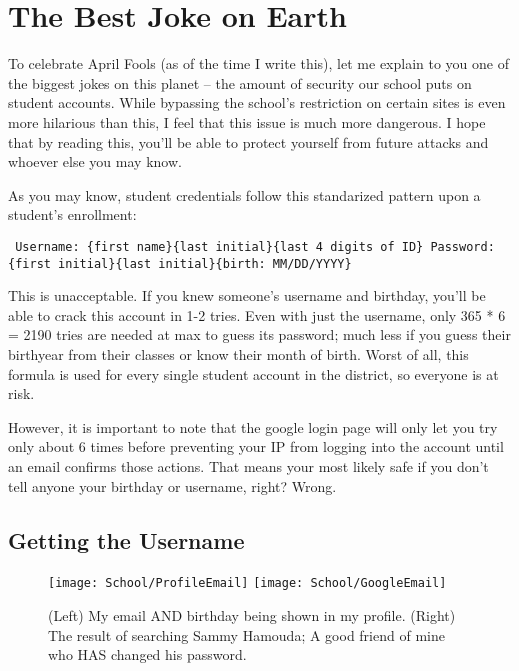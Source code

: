 \section{The Best Joke on Earth}

To celebrate April Fools (as of the time I write this), let me explain to you one of the biggest jokes on this planet -- the amount of security our school puts on student accounts. While bypassing the school's restriction on certain sites is even more hilarious than this, I feel that this issue is much more dangerous. I hope that by reading this, you'll be able to protect yourself from future attacks and whoever else you may know.

As you may know, student credentials follow this standarized pattern upon a student's enrollment:

\begin{centering}
\texttt{
Username: \{first name\}\{last initial\}\{last 4 digits of ID\} \newline
Password: \{first initial\}\{last initial\}\{birth: MM/DD/YYYY\}
}
\end{centering}

This is unacceptable. If you knew someone's username and birthday, you'll be able to crack this account in 1-2 tries. Even with just the username, only 365 * 6 = 2190 tries are needed at max to guess its password; much less if you guess their birthyear from their classes or know their month of birth. Worst of all, this formula is used for every single student account in the district, so everyone is at risk.

However, it is important to note that the google login page will only let you try only about 6 times before preventing your IP from logging into the account until an email confirms those actions. That means your most likely safe if you don't tell anyone your birthday or username, right? Wrong.

\subsection*{Getting the Username}


\begin{figure}[h]
    \centering
    \texttt{[image: School/ProfileEmail]}
    \texttt{[image: School/GoogleEmail]}
    \caption{
        (Left) My email AND birthday being shown in my profile. (Right) The result of searching Sammy Hamouda; A good friend of mine who HAS changed his password.
    }
\end{figure}

